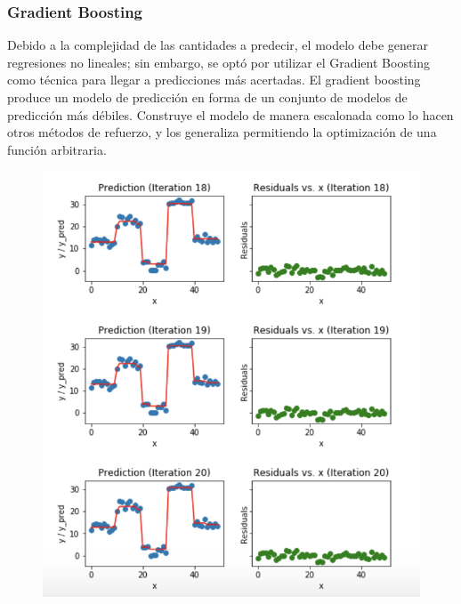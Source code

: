 \documentclass[10pt]{beamer}
\begin{document}
\begin{frame}
\frametitle{Gradient Boosting}
Debido a la complejidad de las cantidades a predecir, el modelo debe generar regresiones no lineales; sin embargo, se optó por utilizar el Gradient  Boosting como técnica para llegar a predicciones más acertadas. El gradient boosting produce un modelo de predicción en forma de un conjunto de modelos de predicción más débiles. Construye el modelo de manera escalonada como lo hacen otros métodos de refuerzo, y los generaliza permitiendo la optimización de una función arbitraria.
\begin{figure}[H]
\includegraphics[scale=0.18]{boosting.png}
\end{figure} 
\end{frame}
\end{document}

